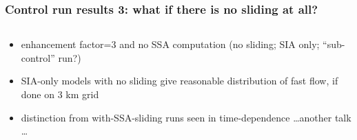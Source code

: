 \documentclass{beamer}
\begin{document}
\begin{frame}
  \frametitle{Control run results 3: what if there is no sliding at all?}

\begin{columns}
\begin{column}{0.6\textwidth}
\scriptsize
\begin{itemize}
\item enhancement factor=3 and no SSA computation (no sliding; SIA only; ``sub-control'' run?)
\item \alert{SIA-only models with no sliding give reasonable distribution of fast flow}, if done on 3 km grid
\item distinction from with-SSA-sliding runs seen in time-dependence \dots another talk \dots
\end{itemize}
\vspace{-0.18in}


\end{column}
\end{columns}
\end{frame}
\end{document}
